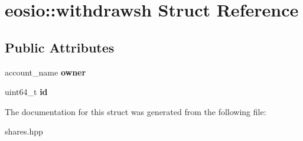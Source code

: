 \hypertarget{structeosio_1_1withdrawsh}{}\section{eosio\+:\+:withdrawsh Struct Reference}
\label{structeosio_1_1withdrawsh}
\subsection*{Public Attributes}
\begin{DoxyCompactItemize}
\item 
\mbox{\label{structeosio_1_1withdrawsh_ac87016a69b003e7ae98b6260f9d069a5}} 
account\+\_\+name {\bfseries owner}
\item 
\mbox{\label{structeosio_1_1withdrawsh_a7bfb70bfb56d4ac26c7361d8e8478c97}} 
uint64\+\_\+t {\bfseries id}
\end{DoxyCompactItemize}


The documentation for this struct was generated from the following file\+:\begin{DoxyCompactItemize}
\item 
shares.\+hpp\end{DoxyCompactItemize}
